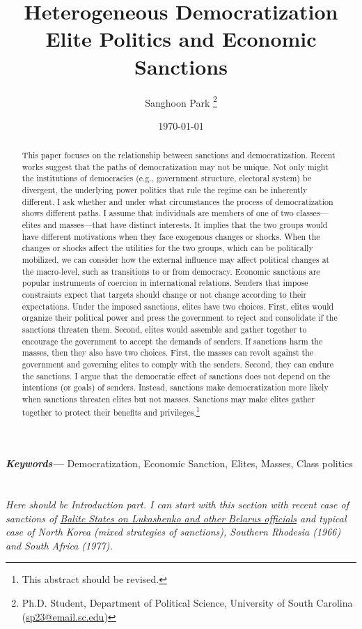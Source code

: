\documentclass[11pt]{article}
\title{\bf Heterogeneous Democratization\\
\Large Elite Politics and Economic Sanctions}
\author{Sanghoon Park
	\thanks{\small Ph.D. Student, Department of Political Science, University of South Carolina\\
		\hspace*{1.8em}(\href{sp23@email.sc.edu}{sp23@email.sc.edu})}}
\date{\today}
\providecommand{\keywords}[1]
{
	\small	
	\hspace*{10mm}\textbf{\textit{Keywords---}} #1
}
\begin{document}
	\maketitle

\begin{abstract}
	\onehalfspacing
	\noindent This paper focuses on the relationship between sanctions and democratization. Recent works suggest that the paths of democratization may not be unique. Not only might the institutions of democracies (e.g., government structure, electoral system) be divergent, the underlying power politics that rule the regime can be inherently different. I ask whether and under what circumstances the process of democratization shows different paths. I assume that individuals are members of one of two classes---elites and masses---that have distinct interests. It implies that the two groups would have different motivations when they face exogenous changes or shocks. When the changes or shocks affect the utilities for the two groups, which can be politically mobilized, we can consider how the external influence may affect political changes at the macro-level, such as transitions to or from democracy. Economic sanctions are popular instruments of coercion in international relations. Senders that impose constraints expect that targets should change or not change according to their expectations. Under the imposed sanctions, elites have two choices. First, elites would organize their political power and press the government to reject and consolidate if the sanctions threaten them. Second, elites would assemble and gather together to encourage the government to accept the demands of senders. If sanctions harm the masses, then they also have two choices. First, the masses can revolt against the government and governing elites to comply with the senders. Second, they can endure the sanctions. I argue that the democratic effect of sanctions does not depend on the intentions (or goals) of senders. Instead, sanctions make democratization more likely when sanctions threaten elites but not masses. Sanctions may make elites gather together to protect their benefits and privileges.\footnote{This abstract should be revised.}
\end{abstract}
\keywords{Democratization, Economic Sanction, Elites, Masses, Class politics}
\newpage
\section*{}
\textit{Here should be Introduction part. I can start with this section with recent case of sanctions of \href{https://www.reuters.com/article/us-belarus-election-sanctions/baltic-states-to-hit-lukashenko-other-belarus-officials-with-sanctions-idUSKBN25R0Z7}{Balitc States on Lukashenko and other Belarus officials} and typical case of North Korea (mixed strategies of sanctions), Southern Rhodesia (1966) and South Africa (1977).} 
\end{document}
